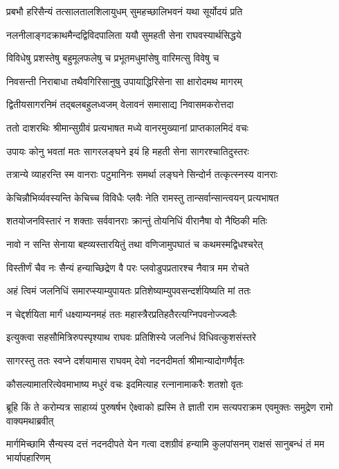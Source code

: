 \twolineshloka
{प्रबभौ हरिसैन्यं तत्सालतालशिलायुधम्}
{सुमहच्छालिभवनं यथा सूर्योदयं प्रति}


\twolineshloka
{नलनीलाङ्गदक्राथमैन्दद्विविदपालिता}
{ययौ सुमहती सेना राघवस्यार्थसिद्धये}


\twolineshloka
{विविधेषु प्रशस्तेषु बहुमूलफलेषु च}
{प्रभूतमधुमांसेषु वारिमत्सु विवेषु च}


\twolineshloka
{निवसन्ती निराबाधा तथैवगिरिसानुषु}
{उपायाद्धिरिसेना सा क्षारोदमथ मागरम्}


\twolineshloka
{द्वितीयसागरनिमं तद्बलबहुलध्वजम्}
{वेलावनं समासाद्य निवासमकरोत्तदा}


\twolineshloka
{ततो दाशरथिः श्रीमान्सुग्रीवं प्रत्यभाषत}
{मध्ये वानरमुख्यानां प्राप्तकालमिदं वचः}


\twolineshloka
{उपायः कोनु भवतां मतः सागरलङ्घने}
{इयं हि महती सेना सागरश्चातिदुस्तरः}


\twolineshloka
{तत्रान्ये व्याहरन्ति स्म वानराः पटुमानिनः}
{समर्था लङ्घने सिन्दोर्न तत्कृत्स्नस्य वानराः}


\twolineshloka
{केचिन्नौभिर्व्यवस्यन्ति केचिच्च विविधैः प्लवैः}
{नेति रामस्तु तान्सर्वान्सान्त्वयन् प्रत्यभाषत}


\twolineshloka
{शतयोजनविस्तारं न शक्ताः सर्ववानराः}
{क्रान्तुं तोयनिधिं वीरानैषा वो नैष्ठिकी मतिः}


\twolineshloka
{नावो न सन्ति सेनाया बह्व्यस्तारयितुं तथा}
{वणिजामुपघातं च कथमस्मद्विधश्चरेत्}


\twolineshloka
{विस्तीर्णं चैव नः सैन्यं हन्याच्छिद्रेण वै परः}
{प्लवोडुपप्रतारश्च नैवात्र मम रोचते}


\twolineshloka
{अहं त्विमं जलनिधिं समारप्स्याम्युपायतः}
{प्रतिशेष्याम्युपवसन्दर्शयिष्यति मां ततः}


\twolineshloka
{न चेद्दर्शयिता मार्गं धक्ष्याम्यनमहं ततः}
{महास्त्रैरप्रतिहतैरत्यग्निपवनोज्ज्वलैः}


\twolineshloka
{इत्युक्त्वा सहसौमित्रिरुपस्पृश्याथ राघवः}
{प्रतिशिस्ये जलनिधं विधिवत्कुशसंस्तरे}


\twolineshloka
{सागरस्तु ततः स्वप्ने दर्शयामास राघवम्}
{देवो नदनदीमर्ता श्रीमान्यादोगणैर्वृतः}


\twolineshloka
{कौसल्यामातरित्येवमाभाष्य मधुरं वचः}
{इदमित्याह रत्नानामाकरैः शतशो वृतः}


\threelineshloka
{ब्रूहि किं ते करोम्यत्र साहाय्यं पुरुषर्षभ}
{ऐक्ष्वाको ह्यस्मि ते ज्ञाती राम सत्यपराक्रम}
{एवमुक्तः समुद्रेण रामो वाक्यमथाब्रवीत्}


\threelineshloka
{मार्गमिच्छामि सैन्यस्य दत्तं नदनदीपते}
{येन गत्वा दशग्रीवं हन्यामि कुलपांसनम्}
{राक्षसं सानुबन्धं तं मम भार्यापहारिणम्}


